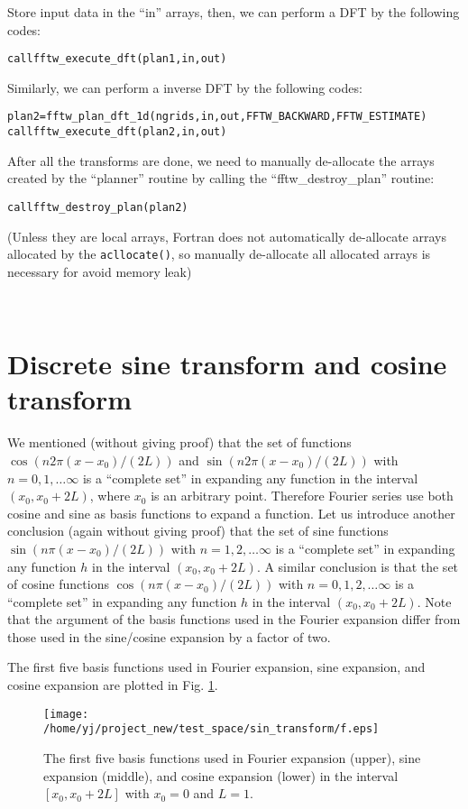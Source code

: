 \documentclass{article}
\newenvironment{tmcode}[1][]{\begin{alltt} }{\end{alltt}}
\begin{document}
Store input data in the ``in'' arrays, then, we can perform a DFT by the
following codes:
\begin{tmcode}
call fftw_execute_dft(plan1, in, out)
\end{tmcode}
Similarly, we can perform a inverse DFT by the following codes:
\begin{tmcode}
plan2 = fftw_plan_dft_1d(ngrids, in,out,FFTW_BACKWARD,FFTW_ESTIMATE)
call fftw_execute_dft(plan2, in, out)
\end{tmcode}
After all the transforms are done, we need to manually de-allocate the arrays
created by the ``planner'' routine by calling the ``fftw\_destroy\_plan''
routine:
\begin{tmcode}
call fftw_destroy_plan(plan2)
\end{tmcode}
(Unless they are local arrays, Fortran does not automatically de-allocate
arrays allocated by the {\texttt{acllocate()}}, so manually de-allocate all
allocated arrays is necessary for avoid memory leak)

\

\section{Discrete sine transform and cosine transform}

We mentioned (without giving proof) that the set of functions $\cos (n 2 \pi
(x - x_0) / (2 L))$ and $\sin (n 2 \pi (x - x_0) / (2 L))$ with $n = 0, 1,
\ldots \infty$ is a ``complete set'' in expanding any function in the interval
$(x_0, x_0 + 2 L)$, where $x_0$ is an arbitrary point. Therefore Fourier
series use both cosine and sine as basis functions to expand a function. Let
us introduce another conclusion (again without giving proof) that the set of
sine functions $\sin (n \pi (x - x_0) / (2 L))$ with $n = 1, 2, \ldots \infty$
is a ``complete set'' in expanding any function $h$ in the interval $(x_0, x_0
+ 2 L)$. A similar conclusion is that the set of cosine functions $\cos (n \pi
(x - x_0) / (2 L))$ with $n = 0, 1, 2, \ldots \infty$ is a ``complete set'' in
expanding any function $h$ in the interval $(x_0, x_0 + 2 L)$. Note that the
argument of the basis functions used in the Fourier expansion differ from
those used in the sine/cosine expansion by a factor of two.

The first five basis functions used in Fourier expansion, sine expansion, and
cosine expansion are plotted in Fig. \ref{18-1-10-e1}.

\begin{figure}[h]
  \texttt{[image: /home/yj/project\_new/test\_space/sin\_transform/f.eps]}
  \caption{ \label{18-1-10-e1}The first five basis functions used in Fourier
  expansion (upper), sine expansion (middle), and cosine expansion (lower) in
  the interval $[x_0, x_0 + 2 L]$ with $x_0 = 0$ and $L = 1$.}
\end{figure}
\end{document}
